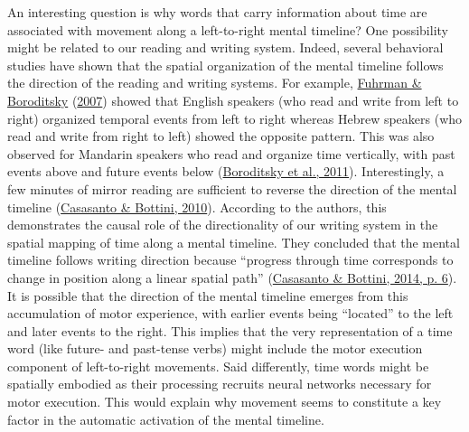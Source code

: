 \documentclass[
  a4paper,12pt,twoside,onecolumn,openright,final,oldfontcommands]{memoir}
\begin{document}
An interesting question is why words that carry information about time are associated with movement along a left-to-right mental timeline? One possibility might be related to our reading and writing system. Indeed, several behavioral studies have shown that the spatial organization of the mental timeline follows the direction of the reading and writing systems. For example, \protect\hyperlink{ref-fuhrman_mental_2007}{Fuhrman \& Boroditsky} (\protect\hyperlink{ref-fuhrman_mental_2007}{2007}) showed that English speakers (who read and write from left to right) organized temporal events from left to right whereas Hebrew speakers (who read and write from right to left) showed the opposite pattern. This was also observed for Mandarin speakers who read and organize time vertically, with past events above and future events below (\protect\hyperlink{ref-boroditsky_english_2011}{Boroditsky et al., 2011}). Interestingly, a few minutes of mirror reading are sufficient to reverse the direction of the mental timeline (\protect\hyperlink{ref-hutchison_can_2010}{Casasanto \& Bottini, 2010}). According to the authors, this demonstrates the causal role of the directionality of our writing system in the spatial mapping of time along a mental timeline. They concluded that the mental timeline follows writing direction because ``progress through time corresponds to change in position along a linear spatial path'' (\protect\hyperlink{ref-casasanto_spatial_2014}{Casasanto \& Bottini, 2014, p. 6}). It is possible that the direction of the mental timeline emerges from this accumulation of motor experience, with earlier events being ``located'' to the left and later events to the right. This implies that the very representation of a time word (like future- and past-tense verbs) might include the motor execution component of left-to-right movements. Said differently, time words might be spatially embodied as their processing recruits neural networks necessary for motor execution. This would explain why movement seems to constitute a key factor in the automatic activation of the mental timeline.
\end{document}
